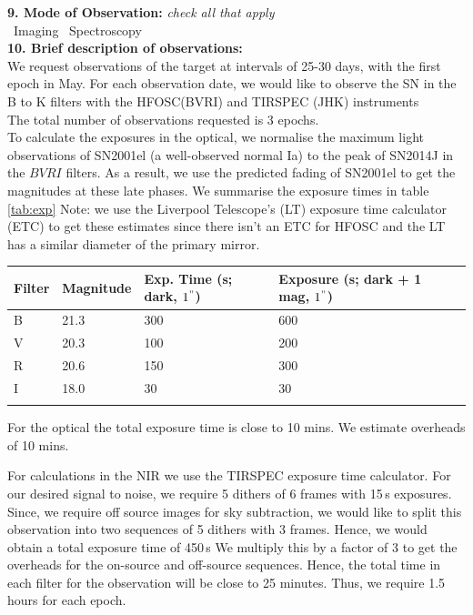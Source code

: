 \documentclass[11pt]{article}
\begin{document}
{\bf 9. Mode of Observation:} {\sl check all that apply}\\ 
%
\YES~Imaging
\NO~Spectroscopy
\\

{\bf 10. Brief description of observations: } \\
We request observations of the target at intervals of 25-30 days, with the first epoch in May. For each observation date, we would like to observe the SN in the  B to K filters with the HFOSC(BVRI) and TIRSPEC (JHK) instruments  \\

The total number of observations requested is 3 epochs.\\

To calculate the exposures in the optical, we normalise the maximum light observations of SN2001el (a well-observed normal Ia) to the peak of SN2014J in the $BVRI$ filters. As a result, we use the predicted fading of SN2001el to get the magnitudes at these late phases. 
We summarise the exposure times in  table \ref{tab:exp}
Note: we use the Liverpool Telescope's (LT) exposure time calculator (ETC) to get these estimates since there isn't an ETC for HFOSC and the LT has a similar diameter of the primary mirror. 

\begin{tabular}{lllll|}
Filter & Magnitude & Exp. Time (s; dark, $1^{"}$)  & Exposure (s; dark + 1 mag, $1^{"}$) \\
\hline
B	& 21.3  & 300 & 600 \\
V	& 20.3 & 100 & 200 \\
R	&  20.6 & 150	&  300   \\
I	&   18.0  & 30 & 30 \\
\hline
\label{tab:exp}
\end{tabular}
\newpage
For the optical the total exposure time is close to 10 mins. We estimate overheads of 10 mins. 

For  calculations in the NIR we use the TIRSPEC exposure time calculator. For our desired signal to noise, we require 5 dithers of 6 frames with 15\,s exposures. Since, we require off source images for sky subtraction, we would like to split this observation into two sequences of 5 dithers with 3 frames. 
Hence, we would obtain a total exposure time of 450\,s 
We multiply this by a factor of 3 to get the overheads for the on-source and off-source sequences. Hence, the total time in each filter for the observation will be close to 25 minutes. Thus, we require 1.5 hours for each epoch.
\end{document}
